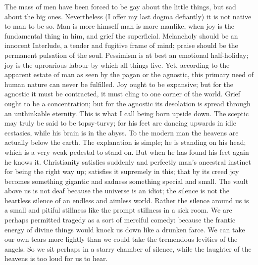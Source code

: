 \documentclass{book}
\begin{document}
The mass of men have been forced to be gay about the little things, but sad about the big ones. Nevertheless (I offer my last dogma defiantly) it is not native to man to be so. Man is more himself man is more manlike, when joy is the fundamental thing in him, and grief the superficial. Melancholy should be an innocent Interlude, a tender and fugitive frame of mind; praise should be the permanent pulsation of the soul. Pessimism is at best an emotional half-holiday; joy is the uproarious labour by which all things live. Yet, according to the apparent estate of man as seen by the pagan or the agnostic, this primary need of human nature can never be fulfilled. Joy ought to be expansive; but for the agnostic it must be contracted, it must cling to one corner of the world. Grief ought to be a concentration; but for the agnostic its desolation is spread through an unthinkable eternity. This is what I call being born upside down. The sceptic may truly be said to be topsy-turvy; for his feet are dancing upwards in idle ecstasies, while his brain is in the abyss. To the modern man the heavens are actually below the earth. The explanation is simple; he is standing on his head; which is a very weak pedestal to stand on. But when he has found his feet again he knows it. Christianity satisfies suddenly and perfectly man’s ancestral instinct for being the right way up; satisfies it supremely in this; that by its creed joy becomes something gigantic and sadness something special and small. The vault above us is not deaf because the universe is an idiot; the silence is not the heartless silence of an endless and aimless world. Rather the silence around us is a small and pitiful stillness like the prompt stillness in a sick room. We are perhaps permitted tragedy as a sort of merciful comedy: because the frantic energy of divine things would knock us down like a drunken farce. We can take our own tears more lightly than we could take the tremendous levities of the angels. So we sit perhaps in a starry chamber of silence, while the laughter of the heavens is too loud for us to hear.
\end{document}
